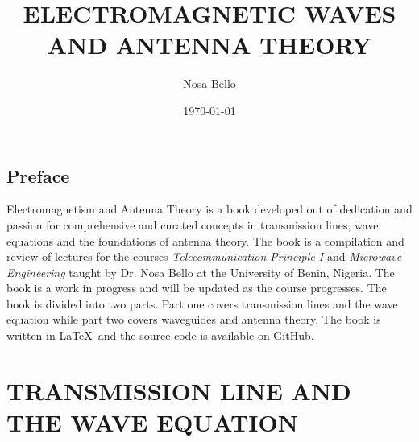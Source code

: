 \documentclass[a4paper,10pt, two column]{book}
\begin{document}
\author{Nosa Bello}
\title{ELECTROMAGNETIC WAVES AND ANTENNA THEORY}
\date{\today}

\frontmatter
\maketitle
\tableofcontents

\chapter{Preface}
Electromagnetism and Antenna Theory is a book developed out of dedication and passion for comprehensive and curated concepts in transmission lines, wave equations and the foundations of antenna theory. The book is a compilation and review of lectures for the courses \textit{Telecommunication Principle I} and \textit{Microwave Engineering} taught by Dr. Nosa Bello at the University of Benin, Nigeria. The book is a work in progress and will be updated as the course progresses. The book is divided into two parts. Part one covers transmission lines and the wave equation while part two covers waveguides and antenna theory. The book is written in \LaTeX\ and the source code is available on \href{https://github.com/allisonoge/electromagnetism-and-antenna-theory-v2.git}{GitHub}.

\mainmatter

\part{TRANSMISSION LINE AND THE WAVE EQUATION}


















 
 
 
 
 
 
 
 
 
 
 
 
 
 
 
 
 
 
 

\backmatter
\printindex

\shipoutAnswer
\end{document}
